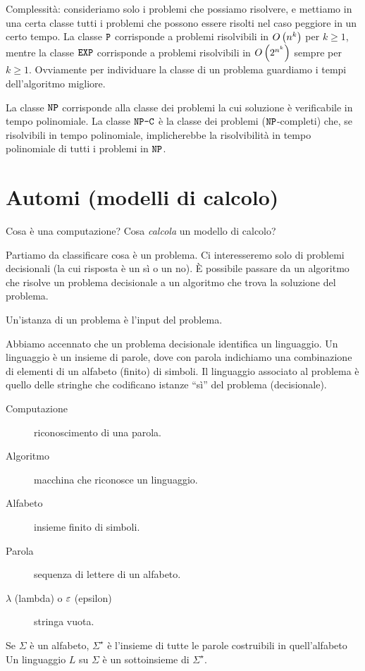 Complessit\`a: consideriamo solo i problemi che possiamo risolvere, e mettiamo in una certa classe tutti i problemi che possono essere risolti nel caso peggiore in un certo tempo.
La classe $\texttt{P}$ corrisponde a problemi risolvibili in $O\left( {n^k} \right)$ per $k \ge 1$, mentre la classe $\texttt{EXP}$ corrisponde a problemi risolvibili in $O\left( {2^{n^k}} \right)$ sempre per $k \ge 1$.
Ovviamente per individuare la classe di un problema guardiamo i tempi dell'algoritmo migliore.

La classe $\texttt{NP}$ corrisponde alla classe dei problemi la cui soluzione \`e verificabile in tempo polinomiale.
La classe $\texttt{NP-C}$ \`e la classe dei problemi ($\texttt{NP}$-completi) che, se risolvibili in tempo polinomiale, implicherebbe la risolvibilit\`a in tempo polinomiale di tutti i problemi in $\texttt{NP}$.

\chapter{Automi (modelli di calcolo)}

Cosa \`e una computazione? Cosa \emph{calcola} un modello di calcolo?

Partiamo da classificare cosa \`e un problema.
Ci interesseremo solo di problemi decisionali (la cui risposta \`e un s\`i o un no).
\`E possibile passare da un algoritmo che risolve un problema decisionale a un algoritmo che trova la soluzione del problema.

Un'istanza di un problema \`e l'input del problema.

Abbiamo accennato che un problema decisionale identifica un linguaggio.
Un linguaggio \`e un insieme di parole, dove con parola indichiamo una combinazione di elementi di un alfabeto (finito) di simboli.
Il linguaggio associato al problema \`e quello delle stringhe che codificano istanze ``s\`i'' del problema (decisionale).

\begin{description}
	\item[Computazione] riconoscimento di una parola.
	\item[Algoritmo] macchina che riconosce un linguaggio.
	\item[Alfabeto] insieme finito di simboli.
	\item[Parola] sequenza di lettere di un alfabeto.
	\item[$\lambda$ (lambda) o $\varepsilon$ (epsilon)] stringa vuota.
\end{description}

Se $\Sigma$ \`e un alfabeto, $\Sigma^{\star}$ \`e l'insieme di tutte le parole costruibili in quell'alfabeto
Un linguaggio $L$ su $\Sigma$ \`e un sottoinsieme di $\Sigma^{\star}$.

